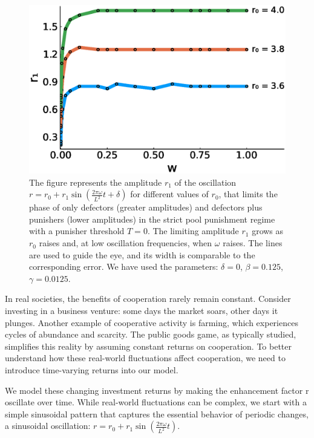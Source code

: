 \begin{figure}
	\centering
	\includegraphics[width=1\linewidth]{Images/P2/grafica_r1_w0_T0_Pool.eps}
	\caption{The figure represents the amplitude $r_1$ of the oscillation $r=r_0+r_1\sin(\frac{2\pi\omega}{L^2}t+\delta)$ for different values of $r_0$, that limits the phase of only defectors (greater amplitudes) and defectors plus punishers (lower amplitudes) in the strict pool punishment regime with a punisher threshold $T=0$. The limiting amplitude $r_1$ grows as $r_0$ raises and, at low oscillation frequencies, when $\omega$ raises. The lines are used to guide the eye, and its width is comparable to the corresponding error. We have used the parameters: $\delta=0$, $\beta=0.125$, $\gamma=0.0125$.}
	\label{r1_w0}
\end{figure}





In real societies, the benefits of cooperation rarely remain constant. Consider investing in a business venture: some days the market soars, other days it plunges. Another example of cooperative activity is farming, which experiences cycles of abundance and scarcity. The public goods game, as typically studied, simplifies this reality by assuming constant returns on cooperation. To better understand how these real-world fluctuations affect cooperation, we need to introduce time-varying returns into our model.

We model these changing investment returns by making the enhancement factor r oscillate over time. While real-world fluctuations can be complex, we start with a simple sinusoidal pattern that captures the essential behavior of periodic changes, a sinusoidal oscillation: $r=r_0+r_1\sin(\frac{2\pi\omega}{L^2}t)$.

